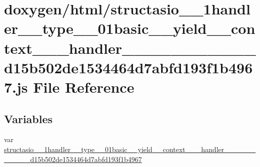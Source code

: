 \hypertarget{structasio__1__1handler____type__3__01basic____yield____context__3__01__handler__01__4__00__01__389abd537c4f15e40a294a56dc5d6a7f}{}\section{doxygen/html/structasio\+\_\+\_\+1handler\+\_\+\+\_\+type\+\_\+\_\+01basic\+\_\+\+\_\+yield\+\_\+\+\_\+context\+\_\+\_\+\_\+handler\+\_\+\_\+\_\+\_\+\_\+\_\+\_\+\_\+\_\+\_\+\_\+d15b502de1534464d7abfd193f1b4967.js File Reference}
\label{structasio__1__1handler____type__3__01basic____yield____context__3__01__handler__01__4__00__01__389abd537c4f15e40a294a56dc5d6a7f}
\subsection*{Variables}
\begin{DoxyCompactItemize}
\item 
var \hyperlink{structasio__1__1handler____type__3__01basic____yield____context__3__01__handler__01__4__00__01__389abd537c4f15e40a294a56dc5d6a7f_a238951537a366477e22712b1552559b2}{structasio\+\_\+\_\+1handler\+\_\+\+\_\+type\+\_\+\_\+01basic\+\_\+\+\_\+yield\+\_\+\+\_\+context\+\_\+\_\+\_\+handler\+\_\+\_\+\_\+\_\+\_\+\_\+\_\+\_\+\_\+\_\+\_\+d15b502de1534464d7abfd193f1b4967}
\end{DoxyCompactItemize}


